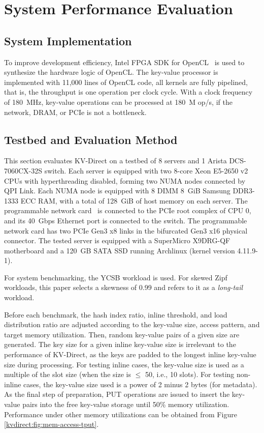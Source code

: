 \section{System Performance Evaluation}
\label{kvdirect:sec:eval}
\label{kvdirect:sec:evaluation}
\label{kvdirect:sec:system-benchmark}

\subsection{System Implementation}

To improve development efficiency, Intel FPGA SDK for OpenCL~\cite{aoc} is used to synthesize the hardware logic of OpenCL. The key-value processor is implemented with 11,000 lines of OpenCL code, all kernels are fully pipelined, that is, the throughput is one operation per clock cycle. With a clock frequency of 180~MHz, key-value operations can be processed at 180~M op/s, if the network, DRAM, or PCIe is not a bottleneck.


\subsection{Testbed and Evaluation Method}

This section evaluates KV-Direct on a testbed of 8 servers and 1 Arista DCS-7060CX-32S switch. Each server is equipped with two 8-core Xeon E5-2650 v2 CPUs with hyperthreading disabled, forming two NUMA nodes connected by QPI Link. Each NUMA node is equipped with 8 DIMM 8~GiB Samsung DDR3-1333 ECC RAM, with a total of 128~GiB of host memory on each server. The programmable network card~\cite{caulfield2016cloud} is connected to the PCIe root complex of CPU 0, and its 40~Gbps Ethernet port is connected to the switch. The programmable network card has two PCIe Gen3 x8 links in the bifurcated Gen3 x16 physical connector. The tested server is equipped with a SuperMicro X9DRG-QF motherboard and a 120~GB SATA SSD running Archlinux (kernel version 4.11.9-1).

For system benchmarking, the YCSB workload \cite{cooper2010benchmarking} is used. For skewed Zipf workloads, this paper selects a skewness of 0.99 and refers to it as a \textit{long-tail} workload.

Before each benchmark, the hash index ratio, inline threshold, and load distribution ratio are adjusted according to the key-value size, access pattern, and target memory utilization. Then, random key-value pairs of a given size are generated. The key size for a given inline key-value size is irrelevant to the performance of KV-Direct, as the keys are padded to the longest inline key-value size during processing. For testing inline cases, the key-value size is used as a multiple of the slot size (when the size is $\leq$ 50, i.e., 10 slots). For testing non-inline cases, the key-value size used is a power of 2 minus 2 bytes (for metadata). As the final step of preparation, PUT operations are issued to insert the key-value pairs into the free key-value storage until 50\% memory utilization. Performance under other memory utilizations can be obtained from Figure \ref{kvdirect:fig:mem-access-tput}.

